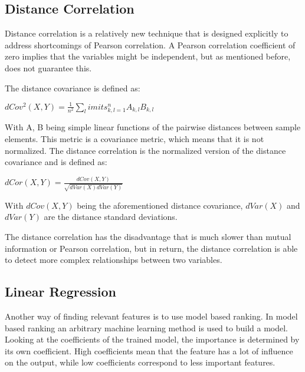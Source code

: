 
\subsection{Distance Correlation}
Distance correlation is a relatively new technique that is designed explicitly to address shortcomings of Pearson correlation. A Pearson correlation coefficient of zero implies that the variables might be independent, but as mentioned before, does not guarantee this. 

\npar

The distance covariance is defined as\citep{distPaper}:
\begin{center}
$dCov^2(X,Y) = \frac{1}{n^2}\sum_limits_{k,l=1}^{n} A_{k,l}B_{k,l}$
\end{center}
With A, B being simple linear functions of the pairwise distances between sample elements. This metric is a covariance metric, which means that it is not normalized. The distance correlation is the normalized version of the distance covariance and is defined as:

\begin{center}
$dCor(X,Y) = \frac{dCov(X,Y)}{\sqrt{dVar(X)dVar(Y)}}$
\end{center}
With $dCov(X,Y)$ being the aforementioned distance covariance, $dVar(X)$ and $dVar(Y)$ are the distance standard deviations. 

\npar

The distance correlation has the disadvantage that is much slower than mutual information or Pearson correlation, but in return, the distance correlation is able to detect more complex relationships between two variables.

\subsection{Linear Regression}
Another way of finding relevant features is to use model based ranking. In model based ranking an arbitrary machine learning method is used to build a model. Looking at the coefficients of the trained model, the importance is determined by its own coefficient. High coefficients mean that the feature has a lot of influence on the output, while low coefficients correspond to less important features.

\npar

